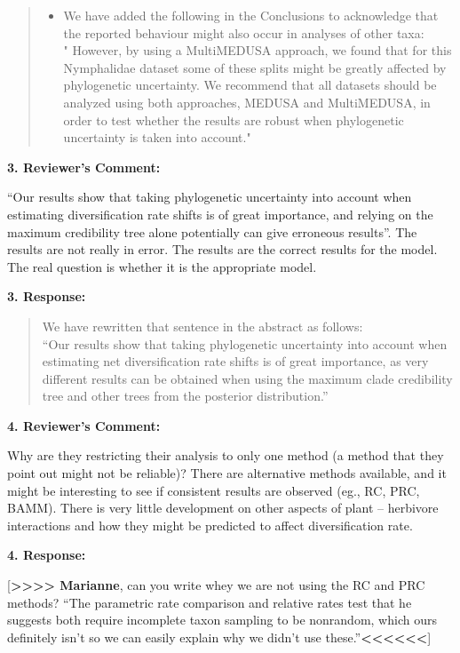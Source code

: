 \documentclass[]{article}
\begin{document}
\begin{quote}
\color{blue}
\begin{itemize}
\itemsep1pt\parskip0pt
\item
  We have added the following in the Conclusions to acknowledge that the
  reported behaviour might also occur in analyses of other taxa:\\"
  However, by using a MultiMEDUSA approach, we found that for this
  Nymphalidae dataset some of these splits might be greatly affected by
  phylogenetic uncertainty. We recommend that all datasets should be
  analyzed using both approaches, MEDUSA and MultiMEDUSA, in order to
  test whether the results are robust when phylogenetic uncertainty is
  taken into account."
\end{itemize}
\end{quote}

\textbf{3. Reviewer's Comment:}

``Our results show that taking phylogenetic uncertainty into account
when estimating diversification rate shifts is of great importance, and
relying on the maximum credibility tree alone potentially can give
erroneous results''. The results are not really in error. The results
are the correct results for the model. The real question is whether it
is the appropriate model.

\textbf{3. Response:}

\begin{quote}
\color{blue}
We have rewritten that sentence in the abstract as follows:\\``Our
results show that taking phylogenetic uncertainty into account when
estimating net diversification rate shifts is of great importance, as
very different results can be obtained when using the maximum clade
credibility tree and other trees from the posterior distribution.''
\end{quote}

\textbf{4. Reviewer's Comment:}

Why are they restricting their analysis to only one method (a method
that they point out might not be reliable)? There are alternative
methods available, and it might be interesting to see if consistent
results are observed (eg., RC, PRC, BAMM). There is very little
development on other aspects of plant -- herbivore interactions and how
they might be predicted to affect diversification rate.

\textbf{4. Response:}

{[}\textbf{\textgreater{}\textgreater{}\textgreater{}\textgreater{}
Marianne}, can you write whey we are not using the RC and PRC methods?
``The parametric rate comparison and relative rates test that he
suggests both require incomplete taxon sampling to be nonrandom, which
ours definitely isn't so we can easily explain why we didn't use
these.''\textbf{\textless{}\textless{}\textless{}\textless{}\textless{}\textless{}}{]}
\end{document}
